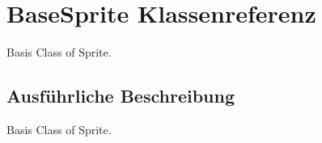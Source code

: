 \hypertarget{class_base_sprite}{
\section{BaseSprite Klassenreferenz}
\label{class_base_sprite}
}


Basis Class of Sprite.  


\subsection{Ausführliche Beschreibung}
Basis Class of Sprite. 